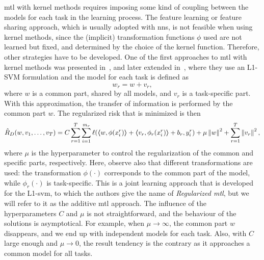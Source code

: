 \acrshort{mtl} with kernel methods requires imposing some kind of coupling between the models for each task in the learning process. The feature learning or feature sharing approach, which is usually adopted with \acrshort{nns}, is not feasible when using kernel methods, since the (implicit) transformation functions $\phi$ used are not learned but fixed, and determined by the choice of the kernel function. Therefore, other strategies have to be developed. 
One of the first approaches to \acrshort{mtl} with kernel methods was presented in~\cite{EvgeniouP04}, and later extended in~\citet{CaiC09, CaiC12}, where they use an L1-SVM formulation and the model for each task is defined as
\begin{equation}
    \nonumber
    {w}_r = {w} + {v}_r,
\end{equation} 
where $w$ is a common part, shared by all models, and $v_r$ is a task-specific part. With this approximation, the transfer of information is performed by the common part ${w}$.
The regularized risk that is minimized is then
\begin{equation}
    \nonumber
    \hat{R}_{D} ({w, v_1, \ldots, v_T}) = C \sum_{r=1}^{T} \sum_{i=1}^{m_r} \ell(
        \bm{\left\langle} w, \phi({x}_i^r) \bm{\right\rangle} + \bm{\left\langle} {v}_r, \phi_r({x}_i^r) \bm{\right\rangle} + b_r, y_i^r) + \mu \left\lVert{w}\right\rVert^2 + \sum_{r=1}^T \left\lVert{v}_r\right\rVert^2,
\end{equation}
where $\mu$ is the hyperparameter to control the regularization of the common and specific parts, respectively. 
Here, observe also that different transformations are used: the transformation $\phi(\cdot)$ corresponds to the common part of the model, while $\phi_r(\cdot)$ is task-specific.
%
This is a joint learning approach that is developed for the L1-\acrshort{svm}, to which the authors give the name of \emph{Regularized \acrshort{mtl}}, but we will refer to it as the {additive} \acrshort{mtl} approach.
The influence of the hyperparameters $C$ and $\mu$ is not straightforward, and the behaviour of the solutions is asymptotical. For example, when $\mu \to \infty$, the common part $w$ disappears, and we end up with independent models for each task. Also, with $C$ large enough and $\mu \to 0$, the result tendency is the contrary as it approaches a common model for all tasks.

